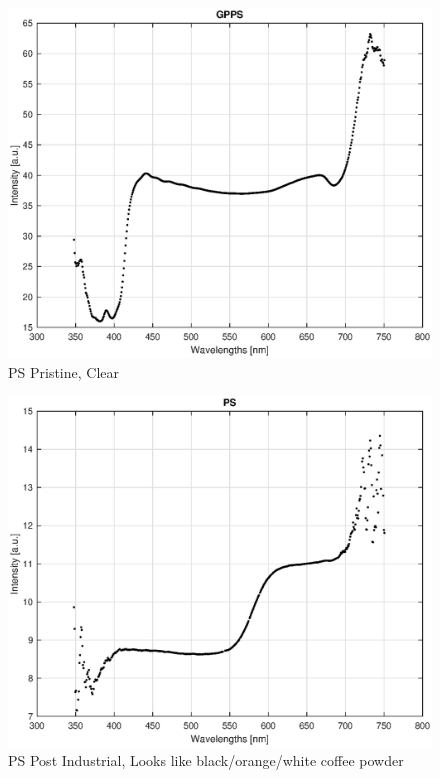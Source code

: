 \begin{appendices}
\begin{figure}
    \centering
    \includegraphics[width = 12cm]{Images/appendix/ps-pristine-clear.eps}
    \caption[$\; \:$PS Pristine]{PS Pristine, Clear}
\end{figure}

\begin{figure}
    \centering
    \includegraphics[width = 12cm]{Images/appendix/ps-postindust.eps}
    \caption[$\; \:$PS Post Industrial]{PS Post Industrial, Looks like black/orange/white coffee powder}
    \label{fig:ps-coffee}
\end{figure}


\end{appendices}
